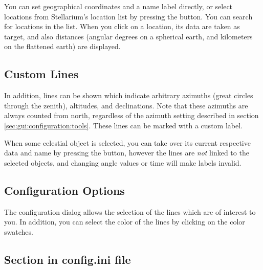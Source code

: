 \noindent You can set  geographical coordinates and a name
label directly, or select locations from Stellarium's location list by
pressing the  button.  You can search for locations in the
list. When you click on a location, its data are taken as target, 
and also distances (angular degrees on a spherical earth, and kilometers on the flattened earth) are displayed.

\subsection{Custom Lines}
\label{sec:plugin:ArchaeoLines:Custom}

In addition, lines can be shown which indicate arbitrary azimuths (great circles through the zenith),
altitudes, and declinations.   Note that these azimuths are always counted
from north, regardless of the azimuth setting described in section
\ref{sec:gui:configuration:tools}. These lines can be marked with a custom label.

When some celestial object is selected, you can take over its current
respective data and name by pressing the
 button, however the lines
are \emph{not} linked to the selected objects, and changing angle
values or time will make labels invalid.

\subsection{Configuration Options}
\label{sec:plugin:ArchaeoLines:configuration}

The configuration dialog allows the selection of the lines which are
of interest to you. 
%
%
In addition, you can select the color of the lines by clicking on the
color swatches.

\subsection*{Section  in config.ini file}

